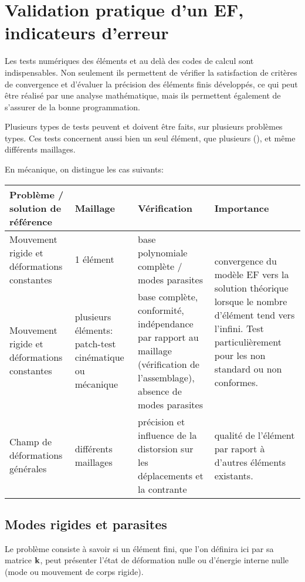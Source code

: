 \medskip
\section{Validation pratique d'un EF, indicateurs d'erreur}\label{Sec-ValidEF}

Les tests numériques des éléments et au delà des codes de calcul sont indispensables.
Non seulement ils permettent de vérifier la satisfaction de critères de convergence
et d'évaluer la précision des éléments finis développés, ce qui peut être
réalisé par une analyse mathématique, mais ils permettent également de s'assurer
de la bonne programmation.

\medskip
Plusieurs types de tests peuvent et doivent être faits, sur plusieurs problèmes
types. Ces tests concernent aussi bien un seul élément, que plusieurs 
(), et même différents maillages.

\medskip
En mécanique, on distingue les cas suivants:\\
\noindent
\begin{tabular}{p{3cm}|p{25mm}|p{5cm}|p{5cm}}
\hline
Problème / solution de référence & Maillage & Vérification & Importance \\
\hline
Mouvement rigide et déformations constantes & 1 élément & base polynomiale complète / modes
parasites & \multirow{2}{5cm}{convergence du modèle EF vers la solution théorique lorsque
le nombre d'élément tend vers l'infini. Test particulièrement pour les non standard ou non
conformes.} \\
\cline{1-3}
Mouvement rigide et déformations constantes & plusieurs éléments: patch-test cinématique\index{Patch-Test}
ou mécanique & base complète, conformité, indépendance par rapport au maillage (vérification
de l'assemblage), absence de modes parasites & \\
\hline
Champ de déformations générales & différents maillages & précision et influence de la
distorsion sur les déplacements et la contrante & qualité de l'élément par raport à d'autres
éléments existants.\\
\hline
\end{tabular}

\medskip
\subsection{Modes rigides et parasites}

Le problème consiste à savoir si un élément fini, que l'on définira ici par sa matrice
$\mathbf{k}$, peut présenter l'état de déformation nulle ou d'énergie interne nulle (mode ou
mouvement de corps rigide).

